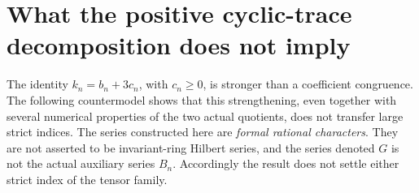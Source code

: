 \section{What the positive cyclic-trace decomposition does not imply}
\label{sec:trace-index-obstruction}

The identity $k_n=b_n+3c_n$, with $c_n\ge0$, is stronger than a
coefficient congruence. The following countermodel shows that this
strengthening, even together with several numerical properties of the
two actual quotients, does not transfer large strict indices. The series
constructed here are \emph{formal rational characters}. They are not
asserted to be invariant-ring Hilbert series, and the series denoted $G$
is not the actual auxiliary series $B_n$. Accordingly the result does
not settle either strict index of the tensor family.

